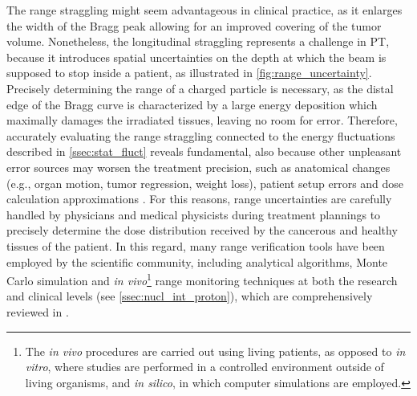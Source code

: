 The range straggling might seem advantageous in clinical practice, as it enlarges the width of the Bragg peak allowing for an improved covering of the tumor volume. Nonetheless, the longitudinal straggling represents a challenge in PT, because it introduces spatial uncertainties on the depth at which the beam is supposed to stop inside a patient, as illustrated in \autoref{fig:range_uncertainty}. Precisely determining the range of a charged particle is necessary, as the distal edge of the Bragg curve is characterized by a large energy deposition which maximally damages the irradiated tissues, leaving no room for error. Therefore, accurately evaluating the range straggling connected to the energy fluctuations described in \autoref{ssec:stat_fluct} reveals fundamental, also because other unpleasant error sources may worsen the treatment precision, such as anatomical changes (e.g., organ motion, tumor regression, weight loss), patient setup errors and dose calculation approximations \cite{Paganetti_2012}. For this reasons, range uncertainties are carefully handled by physicians and medical physicists during treatment plannings to precisely determine the dose distribution received by the cancerous and healthy tissues of the patient. In this regard, many range verification tools have been employed by the scientific community, including analytical algorithms, Monte Carlo simulation and \textit{in vivo}\footnote{The \textit{in vivo} procedures are carried out using living patients, as opposed to \textit{in vitro}, where studies are performed in a controlled environment outside of living organisms, and \textit{in silico}, in which computer simulations are employed.} range monitoring techniques at both the research and clinical levels (see \autoref{ssec:nucl_int_proton}), which are comprehensively reviewed in \cite{rangeVerification}.

